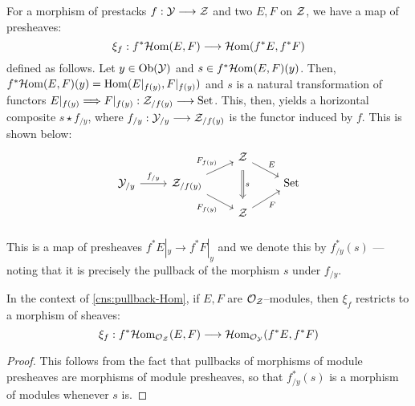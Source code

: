 \documentclass[11pt]{amsart}
\begin{document}
\begin{cns}\label{cns:pullback-Hom}
For a morphism of prestacks $f : \mcY \to \mcZ$ and two
$E, F$ on $\mathcal{Z}$, we have a map of presheaves:
\[
\xi_f : f^*\HHom(E, F) \to[] \HHom(f^*E, f^*F)
\]
defined as follows. Let $y \in \Ob{\mcY}$ and
$s \in f^*\mathcal{H}\mathrm{om}(E, F)(y)$.
Then, $f^*\mathcal{H}\mathrm{om}(E, F)(y) = \mathrm{Hom}(E|_{f(y)}, F|_{f(y)})$ and $s$ is a natural
transformation of functors
$E|_{f(y)} \To F|_{f(y)} : \mcZ_{/f(y)} \to \Set$. This, then, yields
a horizontal composite $s \star f_{/y}$, where
$f_{/y} : \mcY_{/y} \to \mcZ_{/f(y)}$ is the functor induced by $f$.
This is shown below:
\[\begin{tikzcd}[row sep=small]
& &
\mcZ
    \ar[rd, "E" above right]
    \ar[dd, Rightarrow, "s", shorten=0.5em] & \\
\mcY_{/y}
    \ar[r, "f_{/y}"] &
\mcZ_{/f(y)}
    \ar[ru, "F_{f(y)}" above left]
    \ar[rd, "F_{f(y)}" below left] & &
\Set \\ & &
\mcZ
    \ar[ru, "F" below right] & \\
\end{tikzcd}\]
This is a map of presheaves $f^*E|_y \to f^*F|_y$ and we denote this by
$f^*_{/y}(s)$ --- noting that it is precisely the pullback of the morphism
$s$ under $f_{/y}$.
\end{cns}

\begin{prop}
In the context of \cref{cns:pullback-Hom}, if $E, F$ are $\mathcal{O}_\mathcal{Z}$--modules,
then $\xi_f$ restricts to a morphism of sheaves:
\[
\xi_f : f^*\HHom_{\mcO_\mcZ}(E, F) \to[] \HHom_{\mcO_\mcY}(f^*E, f^*F)
\]
\end{prop}
\begin{proof}
This follows from the fact that pullbacks of morphisms of module presheaves
are morphisms of module presheaves, so that $f^*_{/y}(s)$ is a morphism
of modules whenever $s$ is.
\end{proof}
\end{document}
